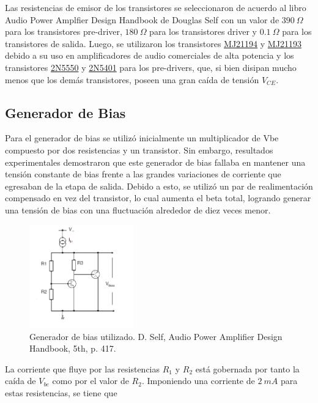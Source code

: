 Las resistencias de emisor de los transistores se seleccionaron de acuerdo al libro Audio Power Amplfier Design Handbook de Douglas Self con un valor de $390 \ \Omega$ para los transistores pre-driver, $180 \ \Omega$ para los transistores driver y $0.1 \ \Omega$ para los transistores de salida.  Luego, se utilizaron los transistores \href{https://www.onsemi.com/pub/Collateral/MJ21193-D.PDF}{MJ21194} y \href{https://www.onsemi.com/pub/Collateral/MJ21193-D.PDF}{MJ21193} debido a su uso en amplificadores de audio comerciales de alta potencia y los transistores \href{https://www.onsemi.com/pub/Collateral/2N5550-D.PDF}{2N5550} y \href{https://www.onsemi.com/pub/Collateral/2N5401-D.PDF}{2N5401} para los pre-drivers, que, si bien disipan mucho menos que los demás transistores, poseen una gran caída de tensión $V_{CE}$.

\subsection{Generador de Bias}

Para el generador de bias se utilizó inicialmente un multiplicador de Vbe compuesto por dos resistencias y un transistor. Sin embargo, resultados experimentales demostraron que este generador de bias fallaba en mantener una tensión constante de bias frente a las grandes variaciones de corriente que egresaban de la etapa de salida. Debido a esto, se utilizó un par de realimentación compensado en vez del transistor, lo cual aumenta el beta total, logrando generar una tensión de bias con una fluctuación alrededor de diez veces menor.

\begin{figure}[H]
\centering
	\includegraphics[width=0.4\textwidth]{ImagenesOutput-Stage/pag417-bias.png}
	\caption{Generador de bias utilizado. D. Self, Audio Power Amplifier Design Handbook, 5th, p. 417.}
	\label{fig:bias}
\end{figure}

La corriente que fluye por las resistencias $R_1$ y $R_2$ está gobernada por tanto la caída de $V_{be}$ como por el valor de $R_2$. Imponiendo una corriente de $2 \ mA$ para estas resistencias, se tiene que


